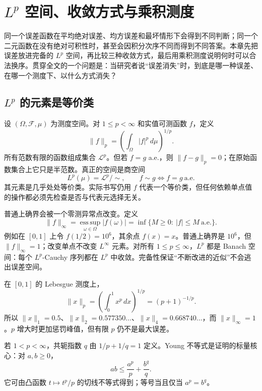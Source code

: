 \chapter{$L^p$ 空间、收敛方式与乘积测度}
\label{ch:lp-product-measure}


同一个误差函数在平均绝对误差、均方误差和最坏情形下会得到不同判断；同一个二元函数在没有绝对可积性时，甚至会因积分次序不同而得到不同答案。本章先把误差放进完备的 $L^p$ 空间，再比较三种收敛方式，最后用乘积测度说明何时可以合法换序。贯穿全文的一个问题是：当研究者说“误差消失”时，到底是哪一种误差、在哪一个测度下、以什么方式消失？

\section{$L^p$ 的元素是等价类}

设 $(\Omega,\mathcal F,\mu)$ 为测度空间。对 $1\leq p<\infty$ 和实值可测函数 $f$，定义
\[
 \lVert f\rVert_p=\left(\int_\Omega |f|^p\,d\mu\right)^{1/p}.
\]
所有范数有限的函数组成集合 $\mathcal L^p$。但若 $f=g$ a.e.，则 $\lVert f-g\rVert_p=0$；在原始函数集合上它只是半范数。真正的空间是商空间
\[
 L^p(\mu)=\mathcal L^p/\!\sim,
 \qquad f\sim g\Longleftrightarrow f=g\ \text{a.e.}
\]
其元素是几乎处处等价类。实际书写仍用 $f$ 代表一个等价类，但任何依赖单点值的操作都必须先检查是否与代表元选择无关。


普通上确界会被一个零测异常点改变。定义
\[
 \lVert f\rVert_\infty
 =\operatorname*{ess\,sup}_{\omega\in\Omega}|f(\omega)|
 =\inf\{M\geq0:\ |f|\leq M\ \text{a.e.}\}.
\]
例如在 $[0,1]$ 上令 $f(1/2)=10^6$，其余点 $f(x)=x$。普通上确界是 $10^6$，但 $\lVert f\rVert_\infty=1$；改变单点不改变 $L^\infty$ 元素。对所有 $1\leq p\leq\infty$，$L^p$ 都是 Banach 空间：每个 $L^p$-Cauchy 序列都在 $L^p$ 中收敛。完备性保证“不断改进的近似”不会逃出误差空间。


在 $[0,1]$ 的 Lebesgue 测度上，
\[
 \lVert x\rVert_p
 =\left(\int_0^1x^p\,dx\right)^{1/p}
 =(p+1)^{-1/p}.
\]
所以 $\lVert x\rVert_1=0.5$、$\lVert x\rVert_2=0.577350\ldots$、$\lVert x\rVert_4=0.668740\ldots$，而 $\lVert x\rVert_\infty=1$。$p$ 增大时更加惩罚峰值，但有限 $p$ 仍不是最大误差。


若 $1<p<\infty$，共轭指数 $q$ 由 $1/p+1/q=1$ 定义。Young 不等式是证明的标量核心：对 $a,b\geq0$，
\[
 ab\leq\frac{a^p}{p}+\frac{b^q}{q}.
\]
它可由凸函数 $t\mapsto t^p/p$ 的切线不等式得到；等号当且仅当 $a^p=b^q$。

